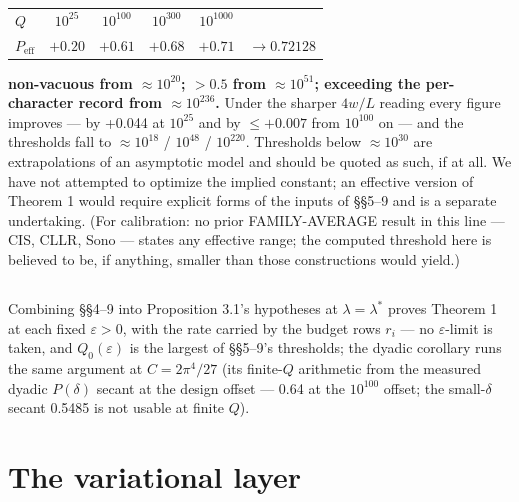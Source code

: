 \documentclass[11pt]{amsart}
\theoremstyle{plain}
\theoremstyle{remark}
\begin{document}
\begin{center}
\bfseries\boldmath
\begin{tabular}{lccccc}
$Q$ & $10^{25}$ & $10^{100}$ & $10^{300}$ & $10^{1000}$ & \\
$P_{\mathrm{eff}}$ & $+0.20$ & $+0.61$ & $+0.68$ & $+0.71$ & $\to 0.72128$ \\
\end{tabular}
\end{center}

\noindent\textbf{\boldmath non-vacuous from $\approx 10^{20}$; $> 0.5$ from
$\approx 10^{51}$; exceeding the per-character record from $\approx 10^{236}$.} Under the sharper $4w/L$ reading every figure
improves --- by +0.044 at $10^{25}$ and by $\le +0.007$ from $10^{100}$ on --- and
the thresholds fall to $\approx 10^{18}$ / $10^{48}$ / $10^{220}$. Thresholds below
$\approx 10^{30}$ are extrapolations of an asymptotic model and should be quoted as
such, if at all. We have not attempted to optimize the implied constant; an effective
version of Theorem 1 would require explicit forms of the inputs of \S\S5--9 and is a
separate undertaking. (For calibration: no prior FAMILY-AVERAGE result in this line
--- CIS, CLLR, Sono --- states any effective range; the computed threshold here is
believed to be, if anything, smaller than those constructions would yield.)

\subsection{}
Combining \S\S4--9 into Proposition 3.1's hypotheses at $\lambda = \lambda^*$ proves
Theorem 1 at each fixed $\varepsilon > 0$, with the rate carried by the budget rows
$r_i$ --- no $\varepsilon$-limit is taken, and $Q_0(\varepsilon)$ is the largest of
\S\S5--9's thresholds; the dyadic corollary runs the same argument at
$C = 2\pi^4/27$ (its finite-$Q$ arithmetic from the measured dyadic $P(\delta)$
secant at the design offset --- 0.64 at the $10^{100}$ offset; the small-$\delta$
secant 0.5485 is not usable at finite $Q$).

\section{The variational layer}
\end{document}
